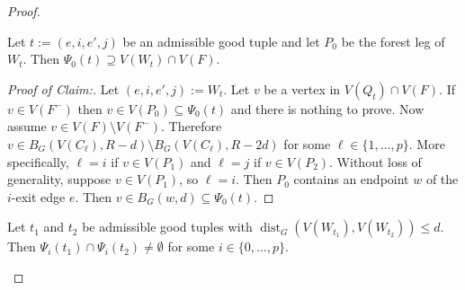 \documentclass{patmorin}
\newenvironment{clmproof}{\begin{proof}[Proof of Claim:]\renewcommand{\qedsymbol}{\rule{1ex}{1ex}}}{\end{proof}}
\DeclareMathOperator{\dist}{dist}
\begin{document}
\begin{proof}
%
%

\begin{clm}\label{overlap}
  Let $t:=(e,i,e',j)$ be an admissible good tuple and let $P_0$ be the forest leg of $W_t$.  Then $\Psi_0(t)\supseteq V(W_t)\cap V(F)$.
\end{clm}

\begin{clmproof}
  Let $(e,i,e',j):=W_t$.
  Let $v$ be a vertex in $V(Q_t)\cap V(F)$.  If $v\in V(F^-)$ then $v\in V(P_0)\subseteq\Psi_0(t)$ and there is nothing to prove.  Now assume $v\in V(F)\setminus V(F^-)$. Therefore $v\in B_G(V(C_\ell),R-d)\setminus B_G(V(C_\ell),R-2d)$ for some $\ell\in\{1,\ldots,p\}$.  More specifically, $\ell=i$ if $v\in V(P_1)$ and $\ell=j$ if $v\in V(P_2)$. Without loss of generality, suppose $v\in V(P_1)$, so $\ell=i$. Then $P_0$ contains an endpoint $w$ of the $i$-exit edge $e$. Then $v\in B_G(w,d)\subseteq\Psi_0(t)$.
\end{clmproof}

\begin{clm}\label{w_distance}
  Let $t_1$ and $t_2$ be admissible good tuples with $\dist_G(V(W_{t_1}),V(W_{t_2}))\le d$.  Then $\Psi_i(t_1)\cap \Psi_i(t_2)\neq\emptyset$ for some $i\in\{0,\ldots,p\}$.
\end{clm}



\end{proof}
\end{document}
